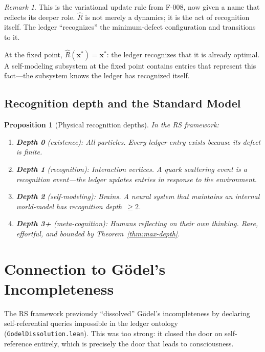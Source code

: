 \documentclass[11pt,a4paper]{article}
\theoremstyle{plain}
\newtheorem{proposition}[theorem]{Proposition}
\theoremstyle{definition}
\theoremstyle{remark}
\newtheorem{remark}[theorem]{Remark}
\begin{document}
\begin{remark}
This is the variational update rule from F-008, now given a name that
reflects its deeper role.  $\hat{R}$ is not merely a dynamics; it is
the act of recognition itself.  The ledger ``recognizes'' the
minimum-defect configuration and transitions to it.

At the fixed point, $\hat{R}(\mathbf{x}^*) = \mathbf{x}^*$: the ledger
recognizes that it is already optimal.  A self-modeling subsystem at the
fixed point contains entries that represent this fact---the subsystem
knows the ledger has recognized itself.
\end{remark}

\subsection{Recognition depth and the Standard Model}

\begin{proposition}[Physical recognition depths]
\label{prop:physical-depths}
In the RS framework:
\begin{enumerate}[nosep]
\item \textbf{Depth 0} (existence): All particles.  Every ledger entry
  exists because its defect is finite.
\item \textbf{Depth 1} (recognition): Interaction vertices.  A quark
  scattering event is a recognition event---the ledger updates entries
  in response to the environment.
\item \textbf{Depth 2} (self-modeling): Brains.  A neural system that
  maintains an internal world-model has recognition depth~$\geq 2$.
\item \textbf{Depth 3+} (meta-cognition): Humans reflecting on their
  own thinking.  Rare, effortful, and bounded by
  Theorem~\ref{thm:max-depth}.
\end{enumerate}
\end{proposition}

\section{Connection to G\"odel's Incompleteness}
\label{sec:godel}

The RS framework previously ``dissolved'' G\"odel's incompleteness by
declaring self-referential queries impossible in the ledger ontology
(\texttt{GodelDissolution.lean}).  This was too strong: it closed the
door on self-reference entirely, which is precisely the door that leads
to consciousness.
\end{document}
